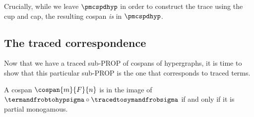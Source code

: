 Crucially, while we leave \(\pmcspdhyp\) in order to construct the trace using
the cup and cap, the resulting cospan \emph{is} in \(\pmcspdhyp\).

\subsection{The traced correspondence}

Now that we have a traced sub-PROP of cospans of hypergraphs, it is time to show
that this particular sub-PROP is the one that corresponds to traced terms.

\begin{theorem}\label{thm:termtohyp-image}
    A cospan \(\cospan{m}{F}{n}\) is in the image of \(
    \termandfrobtohypsigma \circ \tracedtosymandfrobsigma\) if
    and only if it is partial monogamous.
\end{theorem}
